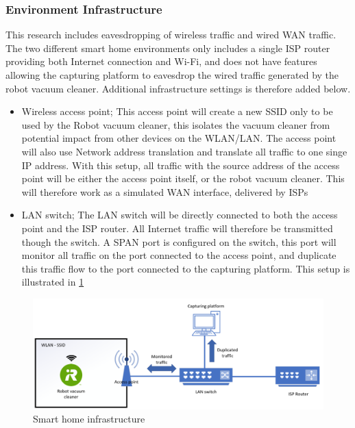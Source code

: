 \subsubsection{Environment Infrastructure}
This research includes eavesdropping of wireless traffic and wired WAN traffic. The two different smart home environments only includes a single ISP router providing both Internet connection and Wi-Fi, and does not have features allowing the capturing platform to eavesdrop the wired traffic generated by the robot vacuum cleaner. Additional infrastructure settings is therefore added below. 
\begin{itemize}
    \item Wireless access point; This access point will create a new SSID only to be used by the Robot vacuum cleaner, this isolates the vacuum cleaner from potential impact from other devices on the WLAN/LAN. The access point will also use Network address translation and translate all traffic to one singe IP address. With this setup, all traffic with the source address of the access point will be either the access point itself, or the robot vacuum cleaner. This will therefore work as a simulated WAN interface, delivered by ISPs
    \item LAN switch; The LAN switch will be directly connected to both the access point and the ISP router. All Internet traffic will therefore be transmitted though the switch. A SPAN port is configured on the switch, this port will monitor all traffic on the port connected to the access point, and duplicate this traffic flow to the port connected to the capturing platform. This setup is illustrated in \ref{fig:WLAN_LAN_setup}
\end{itemize}

\begin{figure}[H]
    \centering
    \includegraphics[width=\textwidth]{figures/WLAN_LAN_setup.png}
    \caption{Smart home infrastructure}
    \label{fig:WLAN_LAN_setup}
\end{figure}




